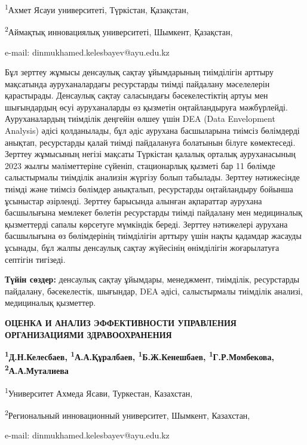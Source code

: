 \begin{affiliation}
\textsuperscript{1}Ахмет Ясауи университеті, Түркістан, Қазақстан,

\textsuperscript{2}Аймақтық инновациялық университеті, Шымкент, Қазақстан,

e-mail: dinmukhamed.kelesbayev@ayu.edu.kz
\end{affiliation}

Бұл зерттеу жұмысы денсаулық сақтау ұйымдарының тиімділігін арттыру
мақсатында ауруханалардағы ресурстарды тиімді пайдалану мәселелерін
қарастырады. Денсаулық сақтау саласындағы бәсекелестіктің артуы мен
шығындардың өсуі ауруханаларды өз қызметін оңтайландыруға мәжбүрлейді.
Ауруханалардың тиімділік деңгейін өлшеу үшін DEA (Data Envelopment
Analysis) әдісі қолданылады, бұл әдіс аурухана басшыларына тиімсіз
бөлімдерді анықтап, ресурстарды қалай тиімді пайдалануға болатынын
білуге көмектеседі. Зерттеу жұмысының негізі мақсаты Түркістан қалалық
орталық ауруханасының 2023 жылғы мәліметтеріне сүйеніп, стационарлық
қызметі бар 11 бөлімде салыстырмалы тиімділік анализін жүргізу болып
табылады. Зерттеу нәтижесінде тиімді және тиімсіз бөлімдер анықталып,
ресурстарды оңтайландыру бойынша ұсыныстар әзірленді. Зерттеу барысында
алынған ақпараттар аурухана басшылығына мемлекет бөлетін ресурстарды
тиімді пайдалану мен медициналық қызметтерді сапалы көрсетуге мүмкіндік
береді. Зерттеу нәтижелері аурухана басшылығына өз бөлімдерінің
тиімділігін арттыру үшін нақты қадамдар жасауды ұсынады, бұл жалпы
денсаулық сақтау жүйесінің өнімділігін жоғарылатуға септігін тигізеді.

{\bfseries Түйін сөздер:} денсаулық сақтау ұйымдары, менеджмент, тиімділік,
ресурстарды пайдалану, бәсекелестік, шығындар, DEA әдісі, салыстырмалы
тиімділік анализі, медициналық қызметтер.

\begin{articleheader}
{\bfseries ОЦЕНКА И АНАЛИЗ ЭФФЕКТИВНОСТИ УПРАВЛЕНИЯ ОРГАНИЗАЦИЯМИ ЗДРАВООХРАНЕНИЯ}

{\bfseries
\textsuperscript{1}Д.Н.Келесбаев\textsuperscript{\envelope },
\textsuperscript{1}А.А.Құралбаев,
\textsuperscript{1}Б.Ж.Кенешбаев,
\textsuperscript{1}Г.Р.Момбекова,
\textsuperscript{2}А.А.Муталиева
}
\end{articleheader}

\begin{affiliation}
\textsuperscript{1}Университет Ахмеда Ясави, Туркестан, Казахстан,

\textsuperscript{2}Региональный инновационный университет, Шымкент, Казахстан,

e-mail: dinmukhamed.kelesbayev@ayu.edu.kz
\end{affiliation}

